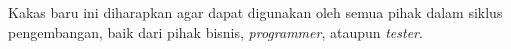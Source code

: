 Kakas baru ini diharapkan agar dapat digunakan oleh semua pihak dalam siklus pengembangan,
baik dari pihak bisnis, \emph{programmer}, ataupun \emph{tester}.






